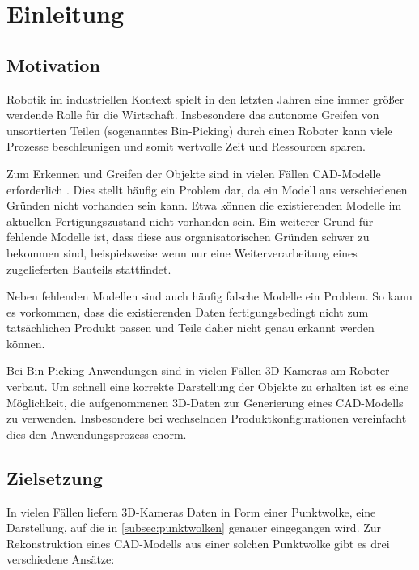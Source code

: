
\chapter{Einleitung}
\label{ch:einleitung}


\section{Motivation}
\label{sec:motivation}

Robotik im industriellen Kontext spielt in den letzten Jahren eine immer größer werdende Rolle für die Wirtschaft.
Insbesondere das autonome Greifen von unsortierten Teilen (sogenanntes Bin-Picking) durch einen Roboter kann viele Prozesse beschleunigen und somit wertvolle Zeit und Ressourcen sparen.

Zum Erkennen und Greifen der Objekte sind in vielen Fällen CAD-Modelle erforderlich \cite{drost2014recognition}.
Dies stellt häufig ein Problem dar, da ein Modell aus verschiedenen Gründen nicht vorhanden sein kann.
Etwa können die existierenden Modelle im aktuellen Fertigungszustand nicht vorhanden sein.
Ein weiterer Grund für fehlende Modelle ist, dass diese aus organisatorischen Gründen schwer zu bekommen sind, beispielsweise wenn nur eine Weiterverarbeitung eines zugelieferten Bauteils stattfindet.

Neben fehlenden Modellen sind auch häufig falsche Modelle ein Problem.
So kann es vorkommen, dass die existierenden Daten fertigungsbedingt nicht zum tatsächlichen Produkt passen und Teile daher nicht genau erkannt werden können.

Bei Bin-Picking-Anwendungen sind in vielen Fällen 3D-Kameras am Roboter verbaut.
Um schnell eine korrekte Darstellung der Objekte zu erhalten ist es eine Möglichkeit, die aufgenommenen 3D-Daten zur Generierung eines CAD-Modells zu verwenden.
Insbesondere bei wechselnden Produktkonfigurationen vereinfacht dies den Anwendungsprozess enorm.



\section{Zielsetzung}
\label{sec:zielsetzung}

In vielen Fällen liefern 3D-Kameras Daten in Form einer Punktwolke, eine Darstellung, auf die in \ref{subsec:punktwolken} genauer eingegangen wird.
Zur Rekonstruktion eines CAD-Modells aus einer solchen Punktwolke gibt es drei verschiedene Ansätze:

